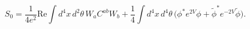 \begin{equation}\label{SQED_Action}
S_0 = \frac{1}{4 e^2} \mbox{Re}\int d^4x\,d^2\theta\,W_a C^{ab} W_b
+ \frac{1}{4}\int d^4x\, d^4\theta\,
\Big(\phi^* e^{2V}\phi +\tilde\phi^*
e^{-2V}\tilde\phi\Big).
\end{equation}

